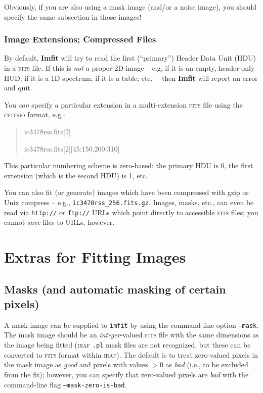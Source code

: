 \documentclass[10pt,a4paper,article]{memoir}
\newcommand{\Imfit}{\textbf{Imfit}}
\newcommand{\imfitprog}{\texttt{imfit}}
\begin{document}
Obviously, if you are also using a mask image (and/or a noise image), you should
specify the same subsection in those images!


\subsection{Image Extensions; Compressed Files}

By default, \Imfit{} will try to read the first (``primary'') Header
Data Unit (HDU) in a \textsc{fits} file. If this is \textit{not} a
proper 2D image -- e.g, if it is an empty, header-only HUD; if it is a
1D spectrum; if it is a table; etc.\ -- then \Imfit{} will report an
error and quit.

You \textit{can} specify a particular extension in a multi-extension
\textsc{fits} file using the \textsc{cfitsio} format, e.g.:

\begin{quote}
ic3478rss.fits[2]

ic3478rss.fits[2][45:150,200:310]
\end{quote}

This particular numbering scheme is zero-based: the primary HDU is 0, the
first extension (which is the second HDU) is 1, etc.

You can also fit (or generate) images which have been compressed with
gzip or Unix compress -- e.g., \texttt{ic3478rss\_256.fits.gz}. Images,
masks, etc., can even be read via \texttt{http://} or \texttt{ftp://}
URLs which point directly to accessible \textsc{fits} files; you cannot
\textit{save} files to URLs, however.



\newpage

\chapter{Extras for Fitting Images}

\section{Masks (and automatic masking of certain pixels)}

A mask image can be supplied to \imfitprog{} by using the command-line
option \texttt{--mask}. The mask image should be an
\textit{integer}-valued \textsc{fits} file with the same dimensions as
the image being fitted (\textsc{iraf} \texttt{.pl} mask files are not
recognized, but these can be converted to \textsc{fits} format within
\textsc{iraf}). The default is to treat zero-valued pixels in the mask
image as \textit{good} and pixels with values $> 0$ as \textit{bad}
(i.e., to be excluded from the fit); however, you can specify that
zero-valued pixels are \textit{bad} with the command-line flag
\texttt{--mask-zero-is-bad}.
\end{document}
